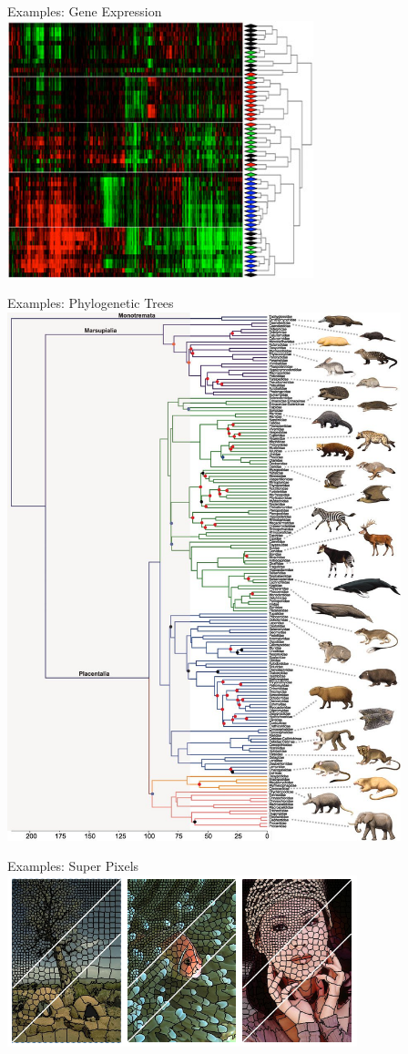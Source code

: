 \documentclass[serif,xcolor=pdftex,dvipsnames,table,hyperref={bookmarks=false,breaklinks}]{beamer}
\begin{document}
\begin{frame}[t]{Examples: Gene Expression}
\center
\includegraphics[width=3.5in]{../Figures/gene_clustering.jpg}
\end{frame}

\begin{frame}[t]{Examples: Phylogenetic Trees}
\center
\includegraphics[width=4.5in]{../Figures/phylogeny.jpg}
\end{frame}

\begin{frame}[t]{Examples: Super Pixels}
\center
\includegraphics[width=4in]{../Figures/super_pixels.png}
\end{frame}
\end{document}
